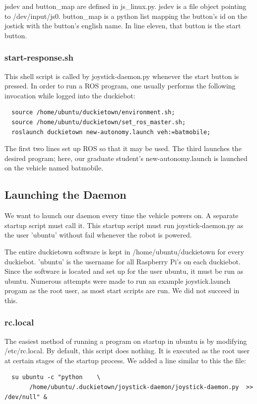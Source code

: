 \documentclass[titlepage]{article}
\begin{document}
jsdev and button\_map are defined in js\_linux.py. jsdev is a file object pointing to /dev/input/js0. button\_map is a python list mapping the button's id on the jostick with the button's english name. In line eleven, that button is the start button. 
\subsubsection{start-response.sh}
This shell script is called by joystick-daemon.py whenever the start button is pressed. In order to run a ROS program, one usually performs the following invocation while logged into the duckiebot:

\begin{lstlisting}
  source /home/ubuntu/duckietown/environment.sh;
  source /home/ubuntu/duckietown/set_ros_master.sh;
  roslaunch duckietown new-autonomy.launch veh:=batmobile;
\end{lstlisting}

The first two lines set up ROS so that it may be used. The third  launches the desired program; here, our graduate student's new-autonomy.launch is launched on the vehicle named batmobile.

\subsection{Launching the Daemon} 
We want to launch our daemon every time the vehicle powers on. A separate startup script must call it. This startup script must run joystick-daemon.py as the user 'ubuntu' without fail whenever the robot is powered. 

The entire duckietown software is kept in /home/ubuntu/duckietown for every duckiebot. 'ubuntu' is the username for all Raspberry Pi's on each duckiebot. Since the software is located and set up for the user ubuntu, it must be run as ubuntu. Numerous attempts were made to run an example joystick.launch progam as the root user, as most start scripts are run. We did not succeed in this.

\subsubsection{rc.local}
The easiest method of running a program on startup in ubuntu is by modifying /etc/rc.local. By default, this script does nothing. It is executed as the root user at certain stages of the startup process. We added a line similar to this the file:
\begin{verbatim}
  su ubuntu -c "python    \
       /home/ubuntu/.duckietown/joystick-daemon/joystick-daemon.py  >> /dev/null" &                                                            
\end{verbatim}
\end{document}
